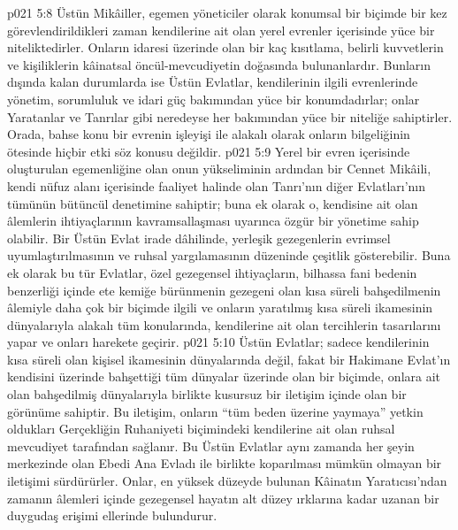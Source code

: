 \vs p021 5:8 Üstün Mikâiller, egemen yöneticiler olarak konumsal bir biçimde bir kez görevlendirildikleri zaman kendilerine ait olan yerel evrenler içerisinde yüce bir niteliktedirler. Onların idaresi üzerinde olan bir kaç kısıtlama, belirli kuvvetlerin ve kişiliklerin kâinatsal öncül\hyp{}mevcudiyetin doğasında bulunanlardır. Bunların dışında kalan durumlarda ise Üstün Evlatlar, kendilerinin ilgili evrenlerinde yönetim, sorumluluk ve idari güç bakımından yüce bir konumdadırlar; onlar Yaratanlar ve Tanrılar gibi neredeyse her bakımından yüce bir niteliğe sahiptirler. Orada, bahse konu bir evrenin işleyişi ile alakalı olarak onların bilgeliğinin ötesinde hiçbir etki söz konusu değildir.
\vs p021 5:9 Yerel bir evren içerisinde oluşturulan egemenliğine olan onun yükseliminin ardından bir Cennet Mikâili, kendi nüfuz alanı içerisinde faaliyet halinde olan Tanrı’nın diğer Evlatları’nın tümünün bütüncül denetimine sahiptir; buna ek olarak o, kendisine ait olan âlemlerin ihtiyaçlarının kavramsallaşması uyarınca özgür bir yönetime sahip olabilir. Bir Üstün Evlat irade dâhilinde, yerleşik gezegenlerin evrimsel uyumlaştırılmasının ve ruhsal yargılamasının düzeninde çeşitlik gösterebilir. Buna ek olarak bu tür Evlatlar, özel gezegensel ihtiyaçların, bilhassa fani bedenin benzerliği içinde ete kemiğe bürünmenin gezegeni olan kısa süreli bahşedilmenin âlemiyle daha çok bir biçimde ilgili ve onların yaratılmış kısa süreli ikamesinin dünyalarıyla alakalı tüm konularında, kendilerine ait olan tercihlerin tasarılarını yapar ve onları harekete geçirir.
\vs p021 5:10 Üstün Evlatlar; sadece kendilerinin kısa süreli olan kişisel ikamesinin dünyalarında değil, fakat bir Hakimane Evlat’ın kendisini üzerinde bahşettiği tüm dünyalar üzerinde olan bir biçimde, onlara ait olan bahşedilmiş dünyalarıyla birlikte kusursuz bir iletişim içinde olan bir görünüme sahiptir. Bu iletişim, onların “tüm beden üzerine yaymaya” yetkin oldukları Gerçekliğin Ruhaniyeti biçimindeki kendilerine ait olan ruhsal mevcudiyet tarafından sağlanır. Bu Üstün Evlatlar aynı zamanda her şeyin merkezinde olan Ebedi Ana Evladı ile birlikte koparılması mümkün olmayan bir iletişimi sürdürürler. Onlar, en yüksek düzeyde bulunan Kâinatın Yaratıcısı’ndan zamanın âlemleri içinde gezegensel hayatın alt düzey ırklarına kadar uzanan bir duygudaş erişimi ellerinde bulundurur.
